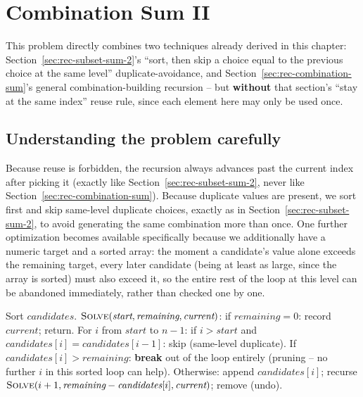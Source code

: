 \section{Combination Sum II}
\label{sec:rec-combination-sum-2}


\begin{patternbox}
This problem directly combines two techniques already derived in this
chapter: Section~\ref{sec:rec-subset-sum-2}'s ``sort, then skip a choice
equal to the previous choice at the same level'' duplicate-avoidance, and
Section~\ref{sec:rec-combination-sum}'s general combination-building
recursion -- but \textbf{without} that section's ``stay at the same
index'' reuse rule, since each element here may only be used once.
\end{patternbox}

\subsection*{Understanding the problem carefully}

Because reuse is forbidden, the recursion always advances past the
current index after picking it (exactly like
Section~\ref{sec:rec-subset-sum-2}, never like
Section~\ref{sec:rec-combination-sum}). Because duplicate values are
present, we sort first and skip same-level duplicate choices, exactly as
in Section~\ref{sec:rec-subset-sum-2}, to avoid generating the same
combination more than once. One further optimization becomes available
specifically because we additionally have a numeric target and a sorted
array: the moment a candidate's value alone exceeds the remaining
target, every later candidate (being at least as large, since the array
is sorted) must also exceed it, so the entire rest of the loop at this
level can be abandoned immediately, rather than checked one by one.

\begin{ideabox}
Sort $\textit{candidates}$. $\textsc{Solve}(\textit{start},
\textit{remaining}, \textit{current})$: if $\textit{remaining}=0$:
record $\textit{current}$; return. For $i$ from $\textit{start}$ to
$n-1$: if $i>\textit{start}$ and $\textit{candidates}[i] =
\textit{candidates}[i-1]$: skip (same-level duplicate). If
$\textit{candidates}[i] > \textit{remaining}$: \textbf{break} out of the
loop entirely (pruning -- no further $i$ in this sorted loop can help).
Otherwise: append $\textit{candidates}[i]$; recurse
$\textsc{Solve}(i+1, \textit{remaining} - \textit{candidates}[i],
\textit{current})$; remove (undo).
\end{ideabox}

